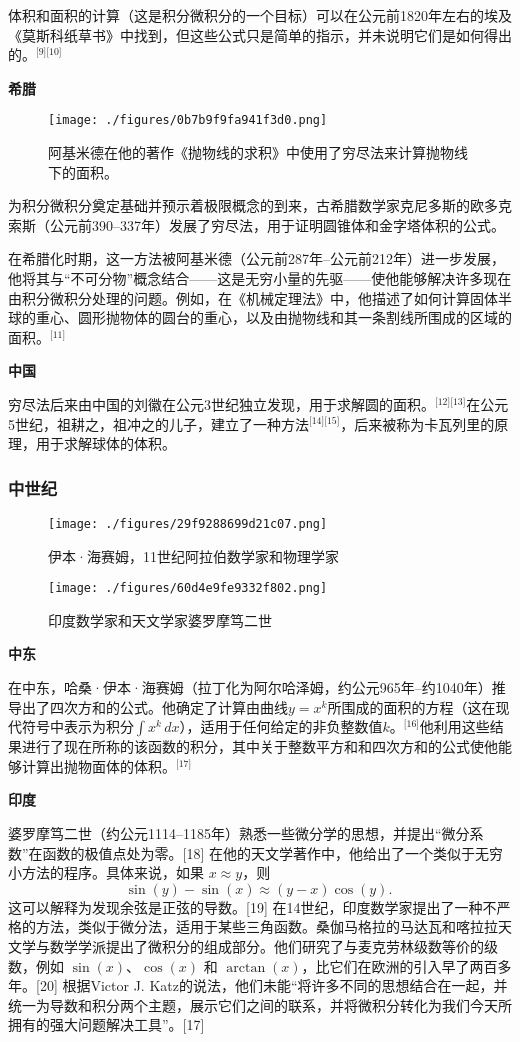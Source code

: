体积和面积的计算（这是积分微积分的一个目标）可以在公元前1820年左右的埃及《莫斯科纸草书》中找到，但这些公式只是简单的指示，并未说明它们是如何得出的。\(^\text{[9][10]}\)

\textbf{希腊}

\begin{figure}[ht]
\centering
\texttt{[image: ./figures/0b7b9f9fa941f3d0.png]}
\caption{阿基米德在他的著作《抛物线的求积》中使用了穷尽法来计算抛物线下的面积。} \label{fig_Calcul_1}
\end{figure}
为积分微积分奠定基础并预示着极限概念的到来，古希腊数学家克尼多斯的欧多克索斯（公元前390–337年）发展了穷尽法，用于证明圆锥体和金字塔体积的公式。

在希腊化时期，这一方法被阿基米德（公元前287年–公元前212年）进一步发展，他将其与“不可分物”概念结合——这是无穷小量的先驱——使他能够解决许多现在由积分微积分处理的问题。例如，在《机械定理法》中，他描述了如何计算固体半球的重心、圆形抛物体的圆台的重心，以及由抛物线和其一条割线所围成的区域的面积。\(^\text{[11]}\)

\textbf{中国} 

穷尽法后来由中国的刘徽在公元3世纪独立发现，用于求解圆的面积。\(^\text{[12][13]}\)在公元5世纪，祖耕之，祖冲之的儿子，建立了一种方法\(^\text{[14][15]}\)，后来被称为卡瓦列里的原理，用于求解球体的体积。
\subsubsection{中世纪}
\begin{figure}[ht]
\centering
\texttt{[image: ./figures/29f9288699d21c07.png]}
\caption{伊本·海赛姆，11世纪阿拉伯数学家和物理学家} \label{fig_Calcul_2}
\end{figure}
\begin{figure}[ht]
\centering
\texttt{[image: ./figures/60d4e9fe9332f802.png]}
\caption{印度数学家和天文学家婆罗摩笃二世} \label{fig_Calcul_3}
\end{figure}

\textbf{中东}  

在中东，哈桑·伊本·海赛姆（拉丁化为阿尔哈泽姆，约公元965年–约1040年）推导出了四次方和的公式。他确定了计算由曲线\(y = x^k\)所围成的面积的方程（这在现代符号中表示为积分\(\int x^k \, dx\)），适用于任何给定的非负整数值\(k\)。\(^\text{[16]}\)他利用这些结果进行了现在所称的该函数的积分，其中关于整数平方和和四次方和的公式使他能够计算出抛物面体的体积。\(^\text{[17]}\)

\textbf{印度}
  
婆罗摩笃二世（约公元1114–1185年）熟悉一些微分学的思想，并提出“微分系数”在函数的极值点处为零。[18] 在他的天文学著作中，他给出了一个类似于无穷小方法的程序。具体来说，如果 \(x \approx y\)，则  
\[
\sin(y) - \sin(x) \approx (y - x) \cos(y).~
\]  
这可以解释为发现余弦是正弦的导数。[19] 在14世纪，印度数学家提出了一种不严格的方法，类似于微分法，适用于某些三角函数。桑伽马格拉的马达瓦和喀拉拉天文学与数学学派提出了微积分的组成部分。他们研究了与麦克劳林级数等价的级数，例如 \(\sin(x)\)、\(\cos(x)\) 和 \(\arctan(x)\)，比它们在欧洲的引入早了两百多年。[20] 根据Victor J. Katz的说法，他们未能“将许多不同的思想结合在一起，并统一为导数和积分两个主题，展示它们之间的联系，并将微积分转化为我们今天所拥有的强大问题解决工具”。[17]